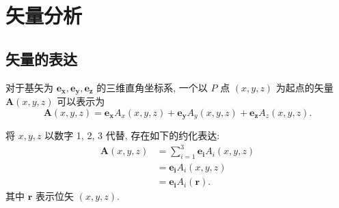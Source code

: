 \section{矢量分析}
\subsection{矢量的表达}
对于基矢为 $\bm{e_x},\bm{e_y},\bm{e_z}$ 的三维直角坐标系, 一个以 $P$ 点 $(x,y,z)$ 为起点的矢量 $\bm{A}(x,y,z)$ 可以表示为
\begin{equation}
    \bm{A}(x,y,z)=\bm{e_x}A_x(x,y,z)+\bm{e_y}A_y(x,y,z)+\bm{e_z}A_z(x,y,z).
\end{equation}

将 $x,y,z$ 以数字 1, 2, 3 代替, 存在如下的约化表达:
\begin{equation}
    \begin{aligned}
        \bm{A}(x,y,z) & =\sum_{i=1}^{3}\bm{e_i}A_i(x,y,z) \\
                      & =\bm{e_i}A_i(x,y,z)               \\
                      & =\bm{e_i}A_i(\bm{r}).
    \end{aligned}
\end{equation}
其中 $\bm{r}$ 表示位矢 $(x,y,z)$.
